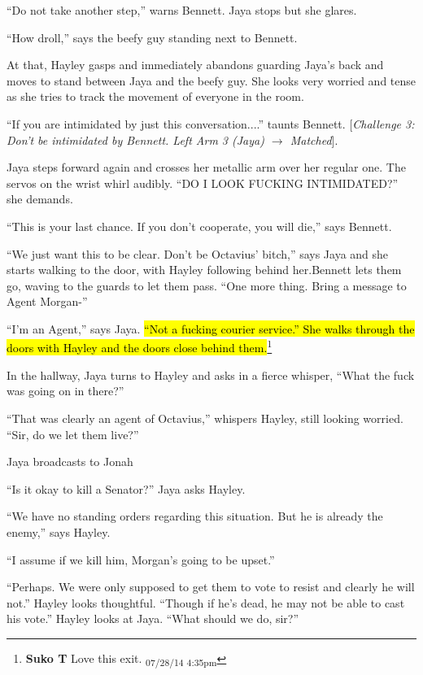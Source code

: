 ``Do not take another step,'' warns Bennett.  Jaya stops but she glares.

``How droll,'' says the beefy guy standing next to Bennett.

At that, Hayley gasps and immediately abandons guarding Jaya's back and moves to stand between Jaya and the beefy guy.  She looks very worried and tense as she tries to track the movement of everyone in the room.

``If you are intimidated by just this conversation....'' taunts Bennett. {[}\textit{Challenge 3: Don't be intimidated by Bennett.   Left Arm 3 (Jaya) $\rightarrow$ Matched}{]}.

Jaya steps forward again and crosses her metallic arm over her regular one.  The servos on the wrist whirl audibly.   ``DO I LOOK FUCKING INTIMIDATED?'' she demands.  

``This is your last chance.  If you don't cooperate, you will die,'' says Bennett.

``We just want this to be clear.  Don't be Octavius' bitch,'' says Jaya and she starts walking to the door, with Hayley following behind her.Bennett lets them go, waving to the guards to let them pass.  ``One more thing.  Bring a message to Agent Morgan-''

``I'm an Agent,'' says Jaya.  \hl{``Not a fucking courier service.''  She walks through the doors with Hayley and the doors close behind them.}\footnote{\textbf{Suko T }Love this exit. \textsubscript{07/28/14 4:35pm}}



In the hallway, Jaya turns to Hayley and asks in a fierce whisper, ``What the fuck was going on in there?''

``That was clearly an agent of Octavius,'' whispers Hayley, still looking worried.  ``Sir, do we let them live?''

Jaya broadcasts to Jonah   

``Is it okay to kill a Senator?'' Jaya asks Hayley.

``We have no standing orders regarding this situation.  But he is already the enemy,'' says Hayley.

``I assume if we kill him, Morgan's going to be upset.''

``Perhaps.  We were only supposed to get them to vote to resist and clearly he will not.''  Hayley looks thoughtful.  ``Though if he's dead, he may not be able to cast his vote.''  Hayley looks at Jaya.  ``What should we do, sir?''

